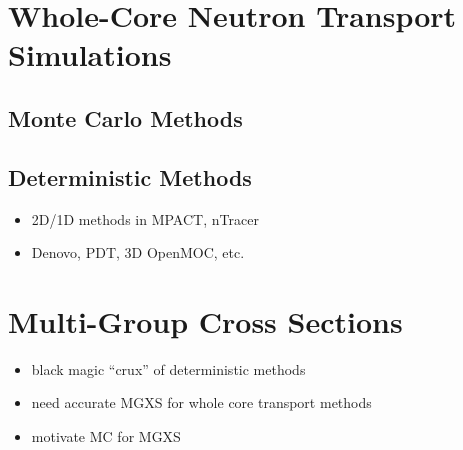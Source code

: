 \section{Whole-Core Neutron Transport Simulations}
\label{sec:chap1-whole-core-transport}


\subsection{Monte Carlo Methods}
\label{subsec:chap1-monte-carlo}


\subsection{Deterministic Methods}
\label{subsec:chap1-deterministic}

\begin{itemize}
  \item 2D/1D methods in MPACT, nTracer
  \item Denovo, PDT, 3D OpenMOC, etc.
\end{itemize}


\section{Multi-Group Cross Sections}
\label{sec:chap1-mgxs}

\begin{itemize}[noitemsep]
  \item black magic ``crux'' of deterministic methods
  \item need accurate \ac{MGXS} for whole core transport methods
  \item motivate \ac{MC} for \ac{MGXS}
\end{itemize}